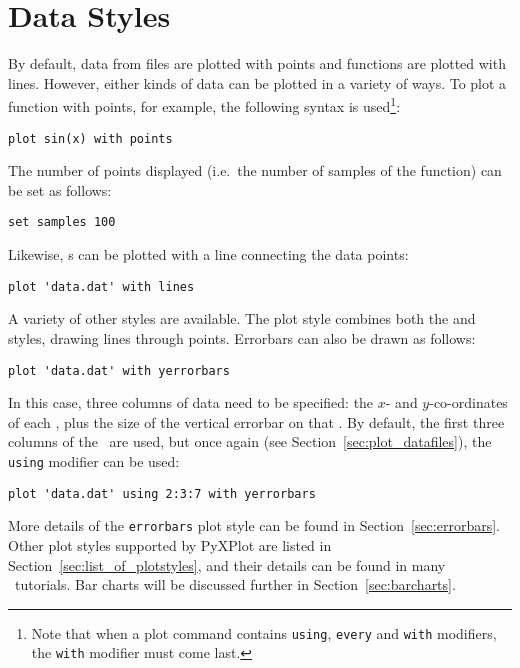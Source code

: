 \section{Data Styles}

By default, data from files are plotted with points and functions are plotted
with lines. However, either kinds of data can be plotted in a variety of ways.
To plot a function with points, for example, the following syntax is
used\footnote{Note that when a plot command contains {\tt using}, {\tt every}
and {\tt with} modifiers, the {\tt with} modifier must come
last.}:

\begin{verbatim}
plot sin(x) with points
\end{verbatim}

\noindent The number of points displayed (i.e.\ the number of samples of the
function) can be set as follows:

\begin{verbatim}
set samples 100
\end{verbatim}

\noindent Likewise, \datafile s can be plotted with a line connecting the data
points:

\begin{verbatim}
plot 'data.dat' with lines
\end{verbatim}

A variety of other styles are available. The  plot style
combines both the  and  styles, drawing lines
through points. Errorbars can also be drawn as follows:

\begin{verbatim}
plot 'data.dat' with yerrorbars
\end{verbatim}

\noindent In this case, three columns of data need to be specified: the $x$-
and $y$-co-ordinates of each \datapoint, plus the size of the vertical errorbar
on that \datapoint. By default, the first three columns of the \datafile\ are
used, but once again (see Section~\ref{sec:plot_datafiles}), the {\tt using}
modifier can be used:

\begin{verbatim}
plot 'data.dat' using 2:3:7 with yerrorbars
\end{verbatim}

More details of the {\tt errorbars} plot style can be found in
Section~\ref{sec:errorbars}. Other plot styles supported by PyXPlot are listed in
Section~\ref{sec:list_of_plotstyles}, and their details can be found in many
\gnuplot\ tutorials. Bar charts will be discussed further in
Section~\ref{sec:barcharts}.

